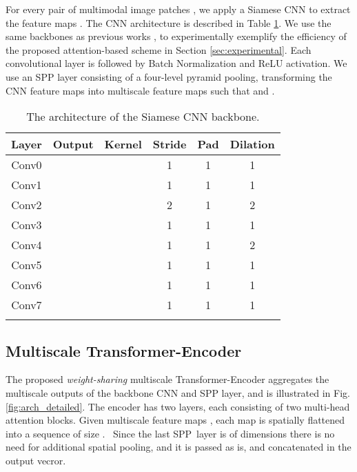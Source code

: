 \documentclass[10pt,journal]{IEEEtran}\usepackage{amsfonts}
\begin{document}
For every pair of multimodal image patches , we
apply a Siamese CNN to extract the feature maps . The CNN architecture is described in Table \ref {tab:cnn}. We use the same backbones as previous works \cite {BetterAndFaster, Zagoruyko}, to experimentally exemplify the efficiency of
the proposed attention-based scheme in Section \ref{sec:experimental}. Each
convolutional layer is followed by Batch Normalization and ReLU activation.
We use an SPP layer \cite{SPP} consisting of a four-level pyramid pooling,
transforming the CNN feature maps into  multiscale feature maps  such that  and .
\begin{table}[tbh]
\setlength\tabcolsep{4pt} \centering
\begin{tabular}{cccccc}
\toprule Layer & Output & Kernel & Stride & Pad & Dilation \\
\midrule Conv0 &  &  & 1 & 1 & 1 \\
Conv1 &  &  & 1 & 1 & 1 \\
Conv2 &  &  & 2 & 1 & 2 \\
Conv3 &  &  & 1 & 1 & 1 \\
Conv4 &  &  & 1 & 1 & 2 \\
Conv5 &  &  & 1 & 1 & 1 \\
Conv6 &  &  & 1 & 1 & 1 \\
Conv7 &  &  & 1 & 1 & 1 \\
\bottomrule &  &  &  &  &
\end{tabular}\caption{The architecture of the Siamese CNN backbone.}
\label{tab:cnn}
\end{table}

\subsection{Multiscale Transformer-Encoder}

\label{subsec:multiscale_transformer}

The proposed \emph{weight-sharing} multiscale Transformer-Encoder aggregates
the  multiscale outputs of the backbone CNN and SPP layer, and is
illustrated in Fig. \ref{fig:arch_detailed}. The encoder has two layers,
each consisting of two multi-head attention blocks. Given  multiscale
feature maps ,
each map is spatially flattened into a sequence of size . \ Since the last SPP\ layer  is of dimensions  there is no need for additional
spatial pooling, and it is passed as is, and concatenated in the output
vecror.
\end{document}
